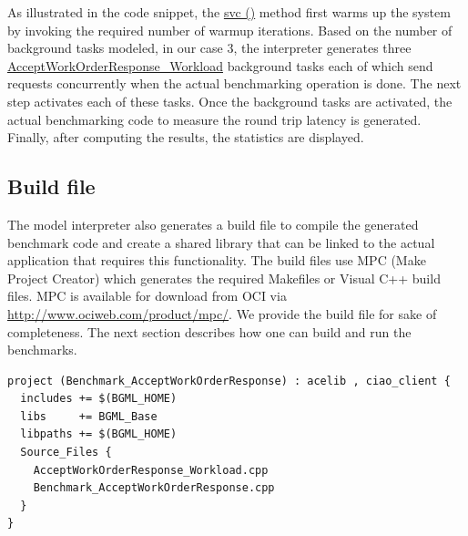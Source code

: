 \documentclass[onecolumn]{article}
\begin{document}
\normalsize
As illustrated in the code snippet, the \url{svc ()} method first
warms up the system by invoking the required number of warmup
iterations. Based on the number of background tasks modeled, in our
case 3, the interpreter generates three
\url{AcceptWorkOrderResponse_Workload} background tasks each of which send
requests concurrently when the actual benchmarking operation is
done. The next step activates each of these tasks. Once the background
tasks are activated, the actual benchmarking code to measure the round
trip latency is generated. Finally, after computing the results, the
statistics are displayed.

\subsection* {Build file}
The model interpreter also generates a build file to compile the
generated benchmark code and create a shared library that can be
linked to the actual application that requires this functionality. The
build files use MPC (Make Project Creator) which generates the
required Makefiles or Visual C++ build files. MPC is available for
download from OCI via \url{http://www.ociweb.com/product/mpc/}. We
provide the build file for sake of completeness. The next section
describes how one can build and run the benchmarks.

{
\footnotesize
\begin{verbatim}
project (Benchmark_AcceptWorkOrderResponse) : acelib , ciao_client {
  includes += $(BGML_HOME)
  libs     += BGML_Base
  libpaths += $(BGML_HOME)
  Source_Files {
    AcceptWorkOrderResponse_Workload.cpp
    Benchmark_AcceptWorkOrderResponse.cpp
  }
}
\end{verbatim}
}
\normalsize
\end{document}
